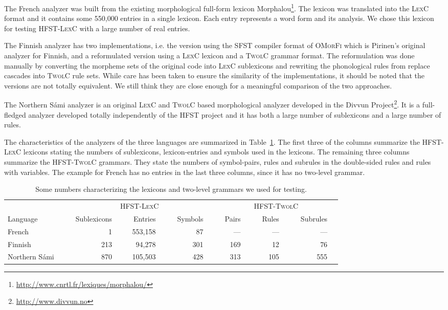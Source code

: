 \documentclass[a4paper]{article}
\begin{document}
The French analyzer was built from the existing morphological
full-form lexicon
Morphalou\footnote{\url{http://www.cnrtl.fr/lexiques/morphalou/}}. The
lexicon was translated into the \textsc{LexC} format and it contains
some 550,000 entries in a single lexicon. Each entry represents a word
form and its analysis. We chose this lexicon for testing
\textsc{HFST-LexC} with a large number of real entries.

The Finnish analyzer has two implementations, i.e. the version using
the \textsc{SFST} compiler format of \textsc{OMorFi} which is
Pirinen's \cite{pirinen2008} original analyzer for Finnish, and a
reformulated version using a \textsc{LexC} lexicon and a
\textsc{TwolC} grammar format. The reformulation was done manually by
converting the morpheme sets of the original code into \textsc{LexC}
sublexicons and rewriting the phonological rules from replace cascades
into \textsc{TwolC} rule sets.  While care has been taken to ensure
the similarity of the implementations, it should be noted that the
versions are not totally equivalent.  We still think they are close
enough for a meaningful comparison of the two approaches.

The Northern S\'{a}mi analyzer is an original \textsc{LexC} and
\textsc{TwolC} based morphological analyzer developed in the Divvun
Project\footnote{\url{http://www.divvun.no}}. It is a full-fledged
analyzer developed totally independently of the \textsc{HFST} project
and it has both a large number of sublexicons and a large number of
rules.

The characteristics of the analyzers of the three languages are
summarized in Table~\ref{fig:lexicon-sizes}. The first three of the
columns summarize the \textsc{HFST-LexC} lexicons stating the numbers
of sublexicons, lexicon-entries and symbols used in the lexicons. The
remaining three columns summarize the \textsc{HFST-TwolC} grammars.
They state the numbers of symbol-pairs, rules and subrules in the
double-sided rules and rules with variables. The example for French
has no entries in the last three columns, since it has no two-level
grammar.

\begin{table}[!h]
  \begin{center}
    \begin{tabular}{l|rrr|rrr}
      \hline
      & \multicolumn{3}{|c}{\textsc{HFST-LexC}} & \multicolumn{3}{|c}{\textsc{HFST-TwolC}} \\
      Language & ~~Sublexicons~~ & ~~Entries~~ & ~~Symbols~~ & ~~Pairs~~ & ~~Rules~~ & ~~Subrules~~\\
      \hline
      French & 1~~ & 553,158~~ & 87~~ & ---~~ & ---~~ & ---~~ \\
      Finnish & 213~~ & 94,278~~ & 301~~ & 169~~ & 12~~ & 76~~ \\
      Northern S\'ami~~ & 870~~ & 105,503~~ & 428~~ & 313~~ & 105~~ & 555~~ \\ 
      \hline
    \end{tabular}
    \vskip0.5cm
  \end{center}
  \caption{Some numbers characterizing the lexicons and two-level
  grammars we used for testing.}\label{fig:lexicon-sizes}
\end{table}
\end{document}
